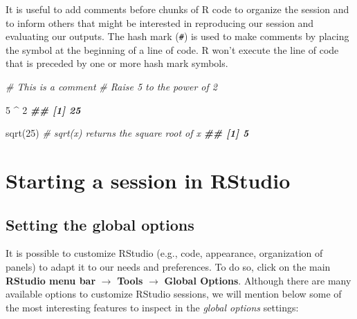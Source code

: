 \documentclass[
]{book}
\newenvironment{Shaded}{\begin{snugshade}}{\end{snugshade}}
\newcommand{\CommentTok}[1]{\textcolor[rgb]{0.56,0.35,0.01}{\textit{#1}}}
\newcommand{\DecValTok}[1]{\textcolor[rgb]{0.00,0.00,0.81}{#1}}
\newcommand{\DocumentationTok}[1]{\textcolor[rgb]{0.56,0.35,0.01}{\textbf{\textit{#1}}}}
\newcommand{\FunctionTok}[1]{\textcolor[rgb]{0.00,0.00,0.00}{#1}}
\newcommand{\NormalTok}[1]{#1}
\newcommand{\SpecialCharTok}[1]{\textcolor[rgb]{0.00,0.00,0.00}{#1}}
\theoremstyle{definition}
\theoremstyle{definition}
\theoremstyle{definition}
\theoremstyle{definition}
\theoremstyle{remark}
\begin{document}
It is useful to add comments before chunks of R code to organize the session and to inform others that might be interested in reproducing our session and evaluating our outputs. The hash mark (\texttt{\#}) is used to make comments by placing the symbol at the beginning of a line of code. R won't execute the line of code that is preceded by one or more hash mark symbols.

\begin{Shaded}
\begin{Highlighting}[]

\CommentTok{\# This is a comment}
\CommentTok{\# Raise 5 to the power of 2}

\DecValTok{5} \SpecialCharTok{\^{}} \DecValTok{2}
\DocumentationTok{\#\# [1] 25}

\FunctionTok{sqrt}\NormalTok{(}\DecValTok{25}\NormalTok{)  }\CommentTok{\# sqrt(x) returns the square root of x}
\DocumentationTok{\#\# [1] 5}
\end{Highlighting}
\end{Shaded}

\hypertarget{starting-a-session-in-rstudio}{%
\section{Starting a session in RStudio}\label{starting-a-session-in-rstudio}}

\hypertarget{setting-the-global-options}{%
\subsection{Setting the global options}\label{setting-the-global-options}}

It is possible to customize RStudio (e.g., code, appearance, organization of panels) to adapt it to our needs and preferences. To do so, click on the main \textbf{RStudio menu bar} \(\rightarrow\) \textbf{Tools} \(\rightarrow\) \textbf{Global Options}. Although there are many available options to customize RStudio sessions, we will mention below some of the most interesting features to inspect in the \emph{global options} settings:
\end{document}
